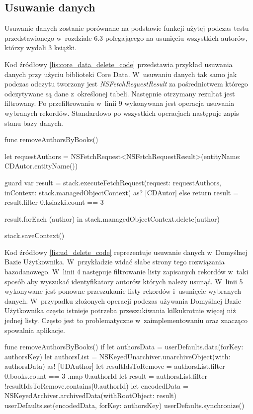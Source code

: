 \subsection{Usuwanie danych}

Usuwanie danych zostanie porównane na podstawie funkcji użytej podczas testu przedstawionego w~rozdziale 6.3 polegającego na usunięciu wszystkich autorów, którzy wydali 3 książki.

 Kod źródłowy \ref{lis:core_data_delete_code} przedstawia przykład usuwania danych przy użyciu biblioteki Core Data. W~usuwaniu danych tak samo jak podczas odczytu tworzony jest \textit{NSFetchRequestResult} za pośrednictwem którego odczytywane są dane z~określonej tabeli. Następnie otrzymany rezultat jest filtrowany. Po przefiltrowaniu w~linii 9 wykonywana jest operacja usuwania wybranych rekordów. Standardowo po wszystkich operacjach następuje zapis stanu bazy danych.
 
\begin{code}[
		language=swift,
		caption={Przykład usuwania danych Core Data},
		label={lis:core_data_delete_code},
	]
    func removeAuthorsByBooks() {
        let requestAuthors = NSFetchRequest<NSFetchRequestResult>(entityName: CDAutor.entityName())
        
        guard var result = stack.executeFetchRequest(request: requestAuthors, inContext: stack.managedObjectContext) as? [CDAutor] else { return }
        result = result.filter { 0.ksiazki.count == 3 }
        
        result.forEach { (author) in
            stack.managedObjectContext.delete(author)
        }
        
        stack.saveContext()
    }
 \end{code}
    
Kod źródłowy \ref{lis:ud_delete_code} reprezentuje usuwanie danych w~Domyślnej Bazie Użytkownika. W~przykładzie widać słabe strony tego rozwiązania bazodanowego. W~linii 4 następuje filtrowanie listy zapisanych rekordów w~taki sposób aby wyszukać identyfikatory autorów których należy usunąć. W~linii 5 wykonywane jest ponowne przeszukanie listy rekordów i~usunięcie wybranych danych. W~przypadku złożonych operacji podczas używania Domyślnej Bazie Użytkownika często istnieje potrzeba przeszukiwania kilkukrotnie więcej niż jednej listy. Często jest to problematyczne w~zaimplementowaniu oraz znacząco spowalnia aplikacje.
    
\begin{code}[
		language=swift,
		caption={Przykład usuwania danych User Defaults},
		label={lis:ud_delete_code},
	]
        func removeAuthorsByBooks() {
        if  let authorsData = userDefaults.data(forKey: authorsKey) {
            let authorsList = NSKeyedUnarchiver.unarchiveObject(with: authorsData) as! [UDAuthor]
            let resultIdsToRemove = authorsList.filter { 0.books.count == 3 }.map { 0.authorId }
            let result = authorsList.filter { !resultIdsToRemove.contains(0.authorId) }
            let encodedData = NSKeyedArchiver.archivedData(withRootObject: result)
            userDefaults.set(encodedData, forKey: authorsKey)
            userDefaults.synchronize()
        }
    }
\end{code}

